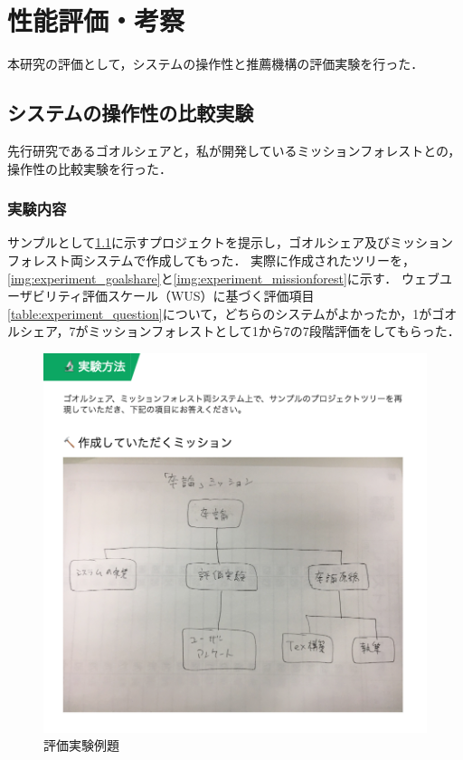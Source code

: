 \chapter{性能評価・考察}
本研究の評価として，システムの操作性と推薦機構の評価実験を行った．

\section{システムの操作性の比較実験}
先行研究であるゴオルシェアと，私が開発しているミッションフォレストとの，操作性の比較実験を行った．

\subsection{実験内容}
サンプルとして\ref{img:experiment_question}に示すプロジェクトを提示し，ゴオルシェア及びミッションフォレスト両システムで作成してもった．
実際に作成されたツリーを，\ref{img:experiment_goalshare}と\ref{img:experiment_missionforest}に示す．
ウェブユーザビリティ評価スケール（WUS）に基づく評価項目\ref{table:experiment_question}について，どちらのシステムがよかったか，1がゴオルシェア，7がミッションフォレストとして1から7の7段階評価をしてもらった．

\begin{figure}[t]
	\begin{center}
		\includegraphics[width=0.9\linewidth]{assets/img/experiment_question.png}
		\caption{評価実験例題}
		\label{img:experiment_question}
	\end{center}
\end{figure}

